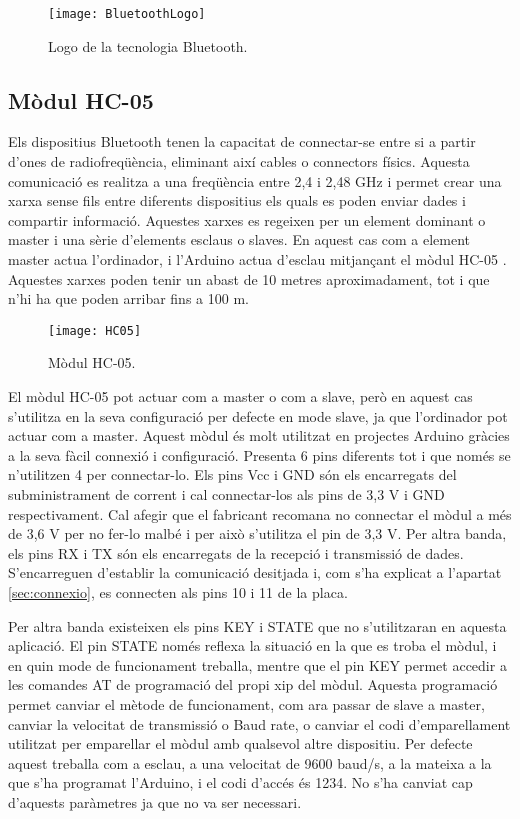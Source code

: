 \begin{figure}[H]
	\centering
	\texttt{[image: BluetoothLogo]}
	\caption{Logo de la tecnologia Bluetooth.}
	\label{fig:BTlogo}
\end{figure}

\subsection{Mòdul HC-05}

Els dispositius Bluetooth tenen la capacitat de connectar-se entre si a partir d’ones de radiofreqüència, eliminant així cables o connectors físics. Aquesta comunicació es realitza a una freqüència entre 2,4 i 2,48 GHz i permet crear una xarxa sense fils entre diferents dispositius els quals es poden enviar dades i compartir informació. Aquestes xarxes es regeixen per un element dominant o master i una sèrie d’elements esclaus o slaves. En aquest cas com a  element master actua l’ordinador, i l’Arduino actua d’esclau mitjançant el mòdul HC-05 \cite{HC05Bib}. Aquestes xarxes poden tenir un abast de 10 metres aproximadament, tot i que n’hi ha que poden arribar fins a 100 m. 

\begin{figure}[H]
	\centering
	\texttt{[image: HC05]}
	\caption{Mòdul HC-05.}
	\label{fig:HC05}
\end{figure}

El mòdul HC-05 pot actuar com a master o com a slave, però en aquest cas s’utilitza en la seva configuració per defecte en mode slave, ja que l’ordinador pot actuar com a master. Aquest mòdul és molt utilitzat en projectes Arduino gràcies a la seva fàcil connexió i configuració. Presenta 6 pins diferents tot i que només se n’utilitzen 4 per connectar-lo. Els pins Vcc i GND són els encarregats del subministrament de corrent i cal connectar-los als pins de 3,3 V i GND respectivament. Cal afegir que el fabricant recomana no connectar el mòdul a més de 3,6 V per no fer-lo malbé i per això s’utilitza el pin de 3,3 V. Per altra banda, els pins RX i TX són els encarregats de la recepció i transmissió de dades. S'encarreguen d'establir la comunicació desitjada i, com s’ha explicat a l’apartat \ref{sec:connexio}, es connecten als pins 10 i 11 de la placa. 

Per altra banda existeixen els pins KEY i STATE que no s’utilitzaran en aquesta aplicació. El pin STATE només reflexa la situació en la que es troba el mòdul, i en quin mode de funcionament treballa, mentre que el pin KEY permet accedir a les comandes AT de programació del propi xip del mòdul. Aquesta programació permet canviar el mètode de funcionament, com ara passar de slave a master, canviar la velocitat de transmissió o Baud rate, o canviar el codi d’emparellament utilitzat per emparellar el mòdul amb qualsevol altre dispositiu. Per defecte aquest treballa com a esclau, a una velocitat de 9600 baud/s, a la mateixa a la que s’ha programat l’Arduino, i el codi d’accés és 1234. No s’ha canviat cap d’aquests paràmetres ja que no va ser necessari. 

